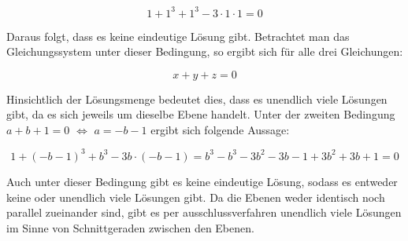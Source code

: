 \documentclass[11pt]{article}
\begin{document}
\[
1 + 1^3 + 1^3 - 3 \cdot 1 \cdot 1 = 0
\]

Daraus folgt, dass es keine eindeutige Lösung gibt.
Betrachtet man das Gleichungssystem unter dieser Bedingung, so ergibt sich für alle drei Gleichungen:

\[
    x + y + z = 0
\]

Hinsichtlich der Lösungsmenge bedeutet dies, dass es unendlich viele Lösungen gibt, da es sich jeweils um dieselbe Ebene handelt.
\bigskip
Unter der zweiten Bedingung $a + b + 1 = 0$ $\Leftrightarrow$ $a= -b-1$ ergibt sich folgende Aussage:

\[
    1 + (-b-1)^3 + b^3 - 3b \cdot (-b-1) = b^3 - b^3 -3b^2 -3b - 1 + 3b^2 + 3b + 1 = 0
\]

Auch unter dieser Bedingung gibt es keine eindeutige Lösung, sodass es entweder keine oder unendlich viele Lösungen gibt.
Da die Ebenen weder identisch noch parallel zueinander sind, gibt es per ausschlussverfahren unendlich viele
Lösungen im Sinne von Schnittgeraden zwischen den Ebenen.



\end{document}
